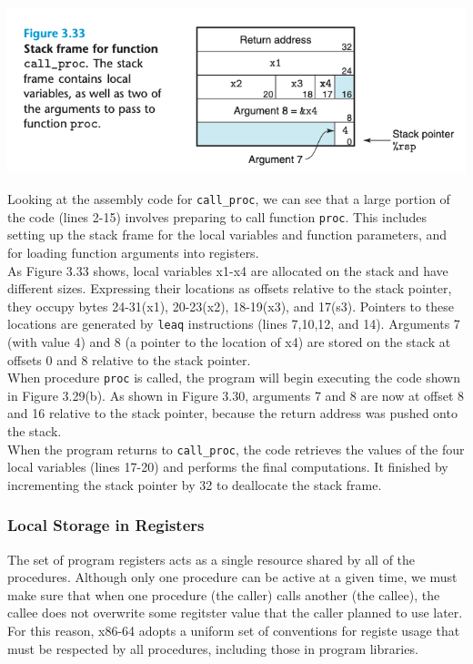 \documentclass[11pt]{article}
\begin{document}
\begin{center}
\includegraphics[width=.9\linewidth]{pics/stack-frame-for-function.png}
\end{center}

Looking at the assembly code for \texttt{call\_proc}, we can see that a large portion of the code (lines 2-15) involves preparing to call function \texttt{proc}. This includes setting up the stack frame for the local variables and function parameters, and for loading function arguments into registers.\\

As Figure 3.33 shows, local variables x1-x4 are allocated on the stack and have different sizes. Expressing their locations as offsets relative to the stack pointer, they occupy bytes 24-31(x1), 20-23(x2), 18-19(x3), and 17(s3). Pointers to these locations are generated by \texttt{leaq} instructions (lines 7,10,12, and 14). Arguments 7 (with value 4) and 8 (a pointer to the location of x4) are stored on the stack at offsets 0 and 8 relative to the stack pointer.\\

When procedure \texttt{proc} is called, the program will begin executing the code shown in Figure 3.29(b). As shown in Figure 3.30, arguments 7 and 8 are now at offset 8 and 16 relative to the stack pointer, because the return address was pushed onto the stack.\\

When the program returns to \texttt{call\_proc}, the code retrieves the values of the four local variables (lines 17-20) and performs the final computations. It finished by incrementing the stack pointer by 32 to deallocate the stack frame.\\

\subsubsection{Local Storage in Registers}
\label{sec:org9394b0d}
The set of program registers acts as a single resource shared by all of the procedures. Although only one procedure can be active at a given time, we must make sure that when one procedure (the caller) calls another (the callee), the callee does not overwrite some regitster value that the caller planned to use later. For this reason, x86-64 adopts a uniform set of conventions for registe usage that must be respected by all procedures, including those in program libraries.\\
\end{document}
